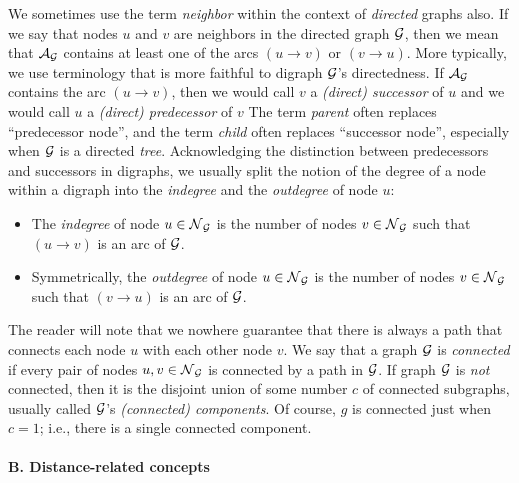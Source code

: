\medskip

We sometimes use the term {\it neighbor} within the context of {\em
  directed} graphs also.  If we say that nodes $u$ and $v$ are
neighbors in the directed graph $\mbox{$\cal G$}$,
then we mean that $\mbox{$\cal A$}_{\mbox{{\scriptsize $\cal G$}}}$ contains at least one of the arcs $(u
  \rightarrow v)$ or $(v \rightarrow u)$.  More typically, we use
  terminology that is more faithful to digraph $\mbox{$\cal G$}$'s directedness.
If $\mbox{$\cal A$}_{\mbox{{\scriptsize $\cal G$}}}$ contains the arc $(u \rightarrow v)$, then we would call
  $v$ a {\it (direct) successor} of $u$
and we would call $u$ a {\it (direct) predecessor} of $v$
The term {\it parent} often replaces ``predecessor node'', and the
term {\it child} often replaces ``successor node'', especially when
$\mbox{$\cal G$}$ is a directed {\em tree}.  Acknowledging the distinction between
predecessors and successors in digraphs, we usually split the notion
of the degree of a node within a digraph into the {\it indegree} and
the {\it outdegree} of node $u$:
\begin{itemize}
\item
The {\it indegree} of node $u \in \mbox{$\cal N$}_{\mbox{{\scriptsize $\cal G$}}}$
is the number of nodes $v \in \mbox{$\cal N$}_{\mbox{{\scriptsize $\cal G$}}}$ such that $(u \rightarrow v)$
is an arc of $\mbox{$\cal G$}$.
\item
Symmetrically, the {\it outdegree} of node $u \in \mbox{$\cal N$}_{\mbox{{\scriptsize $\cal G$}}}$
is the number of nodes $v \in \mbox{$\cal N$}_{\mbox{{\scriptsize $\cal G$}}}$ such that $(v \rightarrow u)$
is an arc of $\mbox{$\cal G$}$.
\end{itemize}

\smallskip

The reader will note that we nowhere guarantee that there is always a
path that connects each node $u$ with each other node $v$.  We say
that a graph $\mbox{$\cal G$}$ is {\it connected}  if every
pair of nodes $u, v \in \mbox{$\cal N$}_{\mbox{{\scriptsize $\cal G$}}}$ is connected by a path in $\mbox{$\cal G$}$.  If
graph $\mbox{$\cal G$}$ is {\em not} connected, then it is the disjoint union of
some number $c$ of connected subgraphs, usually called $\mbox{$\cal G$}$'s {\it
  (connected) components}.   Of
course, $g$ is connected just when $c=1$; i.e., there is a single
connected component.

\paragraph{\small\sf B. Distance-related concepts}

